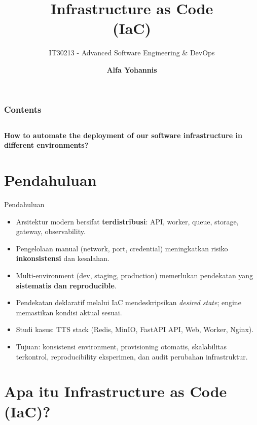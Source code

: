 \documentclass[aspectratio=169, table]{beamer}
\subtitle{IT30213 - Advanced Software Engineering \& DevOps}
\title{\Huge Infrastructure as Code \\\vspace{8pt}	
	(IaC)\vspace{5pt}}
\author{\textbf{Alfa Yohannis}}
\begin{document}
	
	\frame{\titlepage}
	

	\begin{frame}[fragile]
		\frametitle{Contents}
		\vspace{20pt}
		\begin{columns}[t]
			\tableofcontents[sections={1-5}]
			
			\tableofcontents[sections={6-20}]
		\end{columns}
	\end{frame}
	
	\begin{frame}{\hfill}
		\centering
		\Huge{\textbf{How to automate the deployment of our software infrastructure in different environments?}}
	\end{frame}
	

\section{Pendahuluan}

\begin{frame}{Pendahuluan}
	\vspace{6pt}
	\begin{itemize}
		\item Arsitektur modern bersifat \textbf{terdistribusi}: API, worker, queue, storage, gateway, observability.
		\item Pengelolaan manual (network, port, credential) meningkatkan risiko \textbf{inkonsistensi} dan kesalahan.
		\item Multi-environment (dev, staging, production) memerlukan pendekatan yang \textbf{sistematis dan reproducible}.
		\item Pendekatan deklaratif melalui IaC mendeskripsikan \textit{desired state}; engine memastikan kondisi aktual sesuai.
		\item Studi kasus: TTS stack (Redis, MinIO, FastAPI API, Web, Worker, Nginx).
		\item Tujuan: konsistensi environment, provisioning otomatis, skalabilitas terkontrol, reproducibility eksperimen, dan audit perubahan infrastruktur.
	\end{itemize}
\end{frame}


\section{Apa itu Infrastructure as Code (IaC)?}
\end{document}

